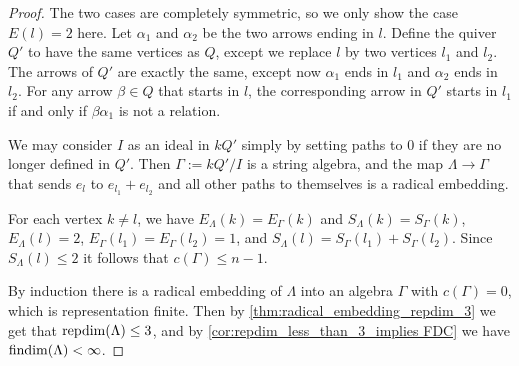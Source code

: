 \begin{theorem}
\begin{proof}
		The two cases are completely symmetric, so we only show the case $E(l)=2$ here. Let $\alpha_1$ and $\alpha_2$ be the two arrows ending in $l$. Define the quiver $Q'$ to have the same vertices as $Q$, except we replace $l$ by two vertices $l_1$ and $l_2$. The arrows of $Q'$ are exactly the same, except now $\alpha_1$ ends in $l_1$ and $\alpha_2$ ends in $l_2$. For any arrow $\beta \in Q$ that starts in $l$, the corresponding arrow in $Q'$ starts in $l_1$ if and only if $\beta\alpha_1$ is not a relation.

		We may consider $I$ as an ideal in $kQ'$ simply by setting paths to 0 if they are no longer defined in $Q'$. Then $\Gamma := kQ'/I$ is a string algebra, and the map $\Lambda \to \Gamma$ that sends $e_l$ to $e_{l_1}+e_{l_2}$ and all other paths to themselves is a radical embedding.

		For each vertex $k \neq l$, we have $E_\Lambda(k) = E_\Gamma(k)$ and $S_\Lambda(k) = S_\Gamma(k)$, $E_\Lambda(l) = 2$,  $E_\Gamma(l_1) = E_\Gamma(l_2) = 1$, and $S_\Lambda(l) = S_\Gamma(l_1)+S_\Gamma(l_2)$. Since $S_\Lambda(l) \leq 2$ it follows that $c(\Gamma) \leq n-1$.

		By induction there is a radical embedding of $\Lambda$ into an algebra $\Gamma$ with $c(\Gamma)=0$, which is representation finite. Then by \cref{thm:radical_embedding_repdim_3} we get that $\operatorname{repdim}(\Lambda) \leq 3$, and by \cref{cor:repdim_less_than_3_implies FDC} we have $\operatorname{findim}(\Lambda) < \infty$.
	\end{proof}
\end{theorem}